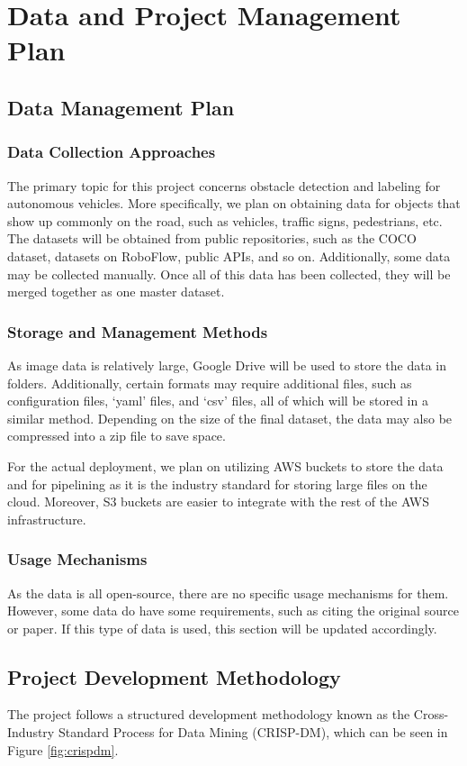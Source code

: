 \documentclass[stu,12pt,floatsintext]{apa7}
\begin{document}
\section{Data and Project Management Plan}
\subsection{Data Management Plan}
\subsubsection{Data Collection Approaches}
The primary topic for this project concerns obstacle detection and labeling for autonomous vehicles. More specifically, we plan on obtaining data for objects that show up commonly on the road, such as vehicles, traffic signs, pedestrians, etc.
The datasets will be obtained from public repositories, such as the COCO dataset, datasets on RoboFlow, public APIs, and so on. Additionally, some data may be collected manually. Once all of this data has been collected, they will be merged together as one master dataset.

\subsubsection{Storage and Management Methods}
As image data is relatively large, Google Drive will be used to store the data in folders. Additionally, certain formats may require additional files, such as configuration files, `yaml' files, and `csv' files, all of which will be stored in a similar method. Depending on the size of the final dataset, the data may also be compressed into a zip file to save space.

For the actual deployment, we plan on utilizing AWS buckets to store the data and for pipelining as it is the industry standard for storing large files on the cloud. Moreover, S3 buckets are easier to integrate with the rest of the AWS infrastructure.

\subsubsection{Usage Mechanisms}
As the data is all open-source, there are no specific usage mechanisms for them. However, some data do have some requirements, such as citing the original source or paper. If this type of data is used, this section will be updated accordingly.


\subsection{Project Development Methodology}
The project follows a structured development methodology known as the Cross-Industry Standard Process for Data Mining (CRISP-DM), which can be seen in Figure \ref{fig:crispdm}.
\end{document}
